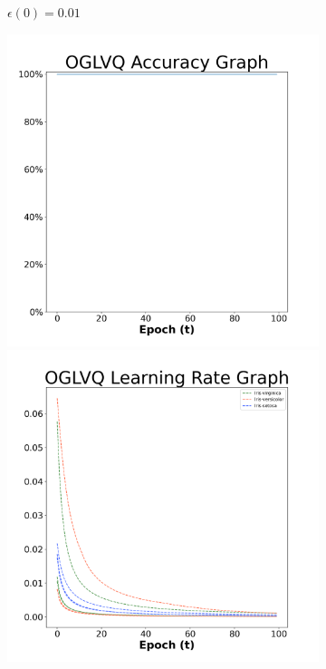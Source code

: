 \begin{figure}[H]
\begin{subfigure}{0.3\textwidth}
  \caption{$\epsilon(0)=0.01$}
\end{subfigure}\hfil %
\begin{subfigure}{0.3\textwidth}
  \includegraphics[width=\linewidth]{images/exper1/iris/OGLVQ_0.03_acc.png}
  \includegraphics[width=\linewidth]{images/exper1/iris/OGLVQ_0.03_lr.png}

\end{subfigure}
\end{figure}
